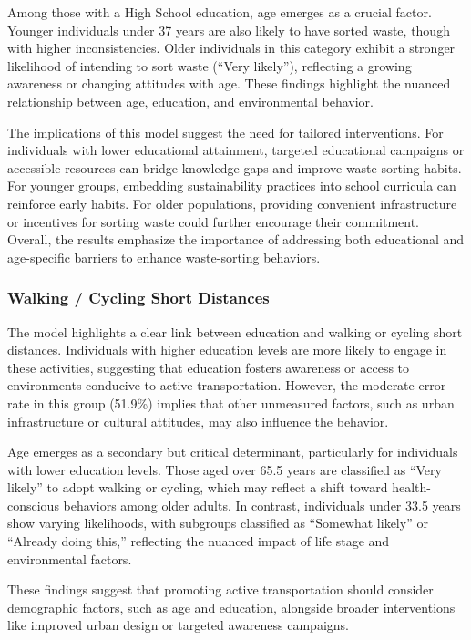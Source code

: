 \documentclass[
  letterpaper,
  DIV=11,
  numbers=noendperiod]{scrartcl}
\begin{document}
Among those with a High School education, age emerges as a crucial
factor. Younger individuals under 37 years are also likely to have
sorted waste, though with higher inconsistencies. Older individuals in
this category exhibit a stronger likelihood of intending to sort waste
(``Very likely''), reflecting a growing awareness or changing attitudes
with age. These findings highlight the nuanced relationship between age,
education, and environmental behavior.

The implications of this model suggest the need for tailored
interventions. For individuals with lower educational attainment,
targeted educational campaigns or accessible resources can bridge
knowledge gaps and improve waste-sorting habits. For younger groups,
embedding sustainability practices into school curricula can reinforce
early habits. For older populations, providing convenient infrastructure
or incentives for sorting waste could further encourage their
commitment. Overall, the results emphasize the importance of addressing
both educational and age-specific barriers to enhance waste-sorting
behaviors.

\subsubsection{Walking / Cycling Short
Distances}\label{walking-cycling-short-distances}

The model highlights a clear link between education and walking or
cycling short distances. Individuals with higher education levels are
more likely to engage in these activities, suggesting that education
fosters awareness or access to environments conducive to active
transportation. However, the moderate error rate in this group (51.9\%)
implies that other unmeasured factors, such as urban infrastructure or
cultural attitudes, may also influence the behavior.

Age emerges as a secondary but critical determinant, particularly for
individuals with lower education levels. Those aged over 65.5 years are
classified as ``Very likely'' to adopt walking or cycling, which may
reflect a shift toward health-conscious behaviors among older adults. In
contrast, individuals under 33.5 years show varying likelihoods, with
subgroups classified as ``Somewhat likely'' or ``Already doing this,''
reflecting the nuanced impact of life stage and environmental factors.

These findings suggest that promoting active transportation should
consider demographic factors, such as age and education, alongside
broader interventions like improved urban design or targeted awareness
campaigns.
\end{document}
